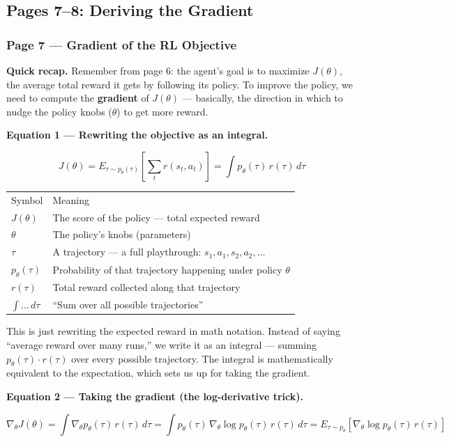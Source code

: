 \subsection{Pages 7--8: Deriving the Gradient}

\subsubsection*{Page 7 --- Gradient of the RL Objective}

\textbf{Quick recap.}
Remember from page 6: the agent's goal is to maximize $J(\theta)$, the average total reward it
gets by following its policy. To improve the policy, we need to compute the \textbf{gradient}
of $J(\theta)$ --- basically, the direction in which to nudge the policy knobs ($\theta$) to
get more reward.

\medskip
\textbf{Equation 1 --- Rewriting the objective as an integral.}

\[
  J(\theta)
  = E_{\tau \sim p_\theta(\tau)}\!\left[\sum_t r(s_t, a_t)\right]
  = \int p_\theta(\tau)\,r(\tau)\,d\tau
\]

\begin{tabular}{ll}
  Symbol & Meaning \\[4pt]
  $J(\theta)$ & The score of the policy --- total expected reward \\
  $\theta$ & The policy's knobs (parameters) \\
  $\tau$ & A trajectory --- a full playthrough: $s_1,a_1,s_2,a_2,\ldots$ \\
  $p_\theta(\tau)$ & Probability of that trajectory happening under policy $\theta$ \\
  $r(\tau)$ & Total reward collected along that trajectory \\
  $\int\ldots\,d\tau$ & ``Sum over all possible trajectories'' \\
\end{tabular}

\medskip
This is just rewriting the expected reward in math notation. Instead of saying ``average reward
over many runs,'' we write it as an integral --- summing $p_\theta(\tau)\cdot r(\tau)$ over
every possible trajectory. The integral is mathematically equivalent to the expectation, which
sets us up for taking the gradient.

\medskip
\textbf{Equation 2 --- Taking the gradient (the log-derivative trick).}

\[
  \nabla_\theta J(\theta)
  = \int \nabla_\theta p_\theta(\tau)\,r(\tau)\,d\tau
  = \int p_\theta(\tau)\,\nabla_\theta \log p_\theta(\tau)\,r(\tau)\,d\tau
  = E_{\tau \sim p_\theta}\!\left[\nabla_\theta \log p_\theta(\tau)\,r(\tau)\right]
\]

